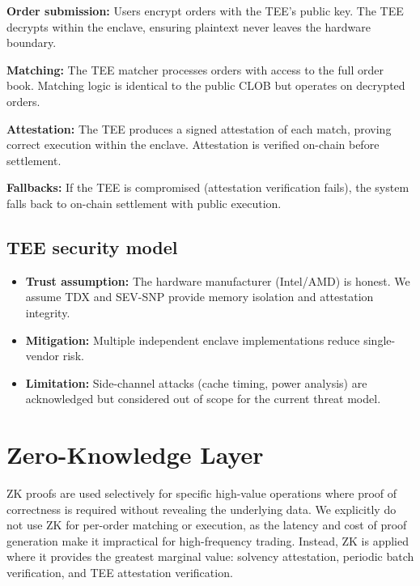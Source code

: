 \documentclass[11pt,a4paper]{article}
\begin{document}
\textbf{Order submission:} Users encrypt orders with the TEE's public key. The TEE decrypts within the enclave, ensuring plaintext never leaves the hardware boundary.

\textbf{Matching:} The TEE matcher processes orders with access to the full order book. Matching logic is identical to the public CLOB but operates on decrypted orders.

\textbf{Attestation:} The TEE produces a signed attestation of each match, proving correct execution within the enclave. Attestation is verified on-chain before settlement.

\textbf{Fallbacks:} If the TEE is compromised (attestation verification fails), the system falls back to on-chain settlement with public execution.

\subsection{TEE security model}

\begin{itemize}
  \item \textbf{Trust assumption:} The hardware manufacturer (Intel/AMD) is honest. We assume TDX and SEV-SNP provide memory isolation and attestation integrity.
  \item \textbf{Mitigation:} Multiple independent enclave implementations reduce single-vendor risk.
  \item \textbf{Limitation:} Side-channel attacks (cache timing, power analysis) are acknowledged but considered out of scope for the current threat model.
\end{itemize}

\section{Zero-Knowledge Layer}
\label{sec:zk}

ZK proofs are used selectively for specific high-value operations where proof of correctness is required without revealing the underlying data. We explicitly do not use ZK for per-order matching or execution, as the latency and cost of proof generation make it impractical for high-frequency trading. Instead, ZK is applied where it provides the greatest marginal value: solvency attestation, periodic batch verification, and TEE attestation verification.
\end{document}
